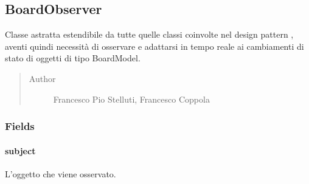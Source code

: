 \documentclass[letterpaper,10pt,italian]{sphinxmanual}
\begin{document}
\subsection{BoardObserver}
\label{\detokenize{source/it/unicam/cs/pa/mastermind/ui/BoardObserver:boardobserver}}\label{\detokenize{source/it/unicam/cs/pa/mastermind/ui/BoardObserver::doc}}

\begin{fulllineitems}
\label{\detokenize{source/it/unicam/cs/pa/mastermind/ui/BoardObserver:it.unicam.cs.pa.mastermind.ui.BoardObserver}}
Classe astratta estendibile da tutte quelle classi coinvolte nel design pattern , aventi quindi necessità di osservare e adattarsi in tempo reale ai cambiamenti di stato di oggetti di tipo BoardModel.
\begin{quote}\begin{description}
\item[{Author}] \leavevmode
Francesco Pio Stelluti, Francesco Coppola

\end{description}\end{quote}

\end{fulllineitems}



\subsubsection{Fields}
\label{\detokenize{source/it/unicam/cs/pa/mastermind/ui/BoardObserver:fields}}

\paragraph{subject}
\label{\detokenize{source/it/unicam/cs/pa/mastermind/ui/BoardObserver:subject}}

\begin{fulllineitems}
\label{\detokenize{source/it/unicam/cs/pa/mastermind/ui/BoardObserver:it.unicam.cs.pa.mastermind.ui.BoardObserver.subject}}
L’oggetto che viene osservato.

\end{fulllineitems}
\end{document}
